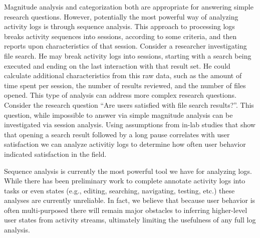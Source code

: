 Magnitude analysis and categorization both are appropriate for answering simple research questions. However, potentially the most powerful way of analyzing activity logs is through sequence analysis. 
This approach to processing logs breaks activity sequences into sessions, according to some criteria, and then reports upon characteristics of that session. Consider a researcher investigating file search. He may break activity logs into sessions, starting with a search being executed and ending on the last interaction with that result set. He could calculate additional characteristics from this raw data, such as the amount of time spent per session, the number of results reviewed, and the number of files opened.   
This type of analysis can address more complex research questions. Consider the research question ``Are users satisfied with file search results?''. This question, while impossible to answer via simple magnitude analysis can be investigated via session analysis. Using assumptions from in-lab studies that show that opening a search result followed by a long pause correlates with user satisfaction we can analyze activitiy logs to determine how often user behavior indicated satisfaction in the field. 

Sequence analysis is currently the most powerful tool we have for analyzing logs. While there has been preliminary work to complete annotate activity logs into tasks or even states (e.g., editing, searching, navigating, testing, etc.) these analyses are currently unreliable. In fact, we believe that because user behavior is often multi-purposed there will remain major obstacles to inferring higher-level user states from activity streams, ultimately limiting the usefulness of any full log analysis. 



